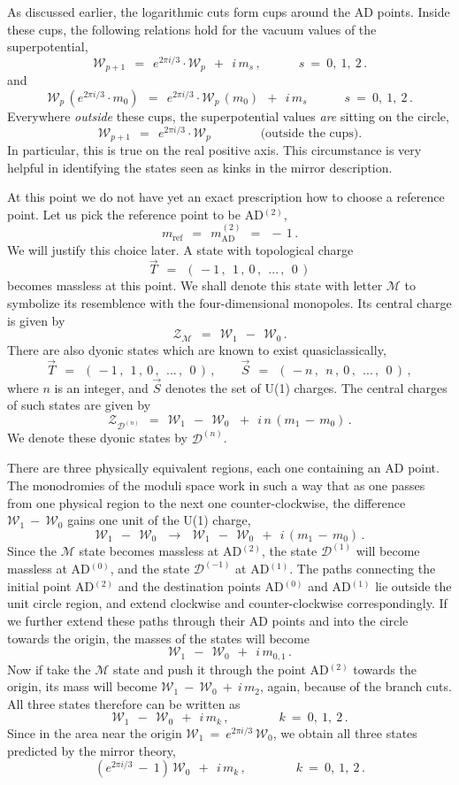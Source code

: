 \documentclass[epsfig,12pt]{article}
\def\beq{\begin{equation}}
\def\eeq{\end{equation}}
\def\beq{\begin{equation}}
\def\eeq{\end{equation}}
\newcommand{\mc}[1]{\mathcal{#1}}
\newcommand{\W}{\mathcal{W}}
\newcommand{\M}{\mathcal{M}}
\newcommand{\D}{\mathcal{D}}
\begin{document}
	As discussed earlier, the logarithmic cuts form cups around the AD points. 
	Inside these cups, the following relations hold for the vacuum values of the superpotential,
\beq
	\W_{p+1} ~~=~~ e^{2 \pi i / 3} \cdot \W_p ~~+~~ i\, m_s\,, \qquad\quad s~=~0,~1,~2\,.
\eeq
	and
\beq
	\W_p\, (e^{2 \pi i / 3} \cdot m_0) ~~=~~ e^{2 \pi i / 3} \cdot \W_p\, (m_0) ~~+~~ i\, m_s
	\qquad\quad s~=~0,~1,~2\,.
\eeq
	Everywhere {\it outside} these cups, the superpotential values {\it are} sitting on the circle,
\beq
	\W_{p+1} ~~=~~ e^{2 \pi i / 3} \cdot \W_p
	\qquad\qquad \text{(outside the cups)}.
\eeq
	In particular, this is true on the real positive axis.
	This circumstance is very helpful in identifying the states seen as kinks in the mirror description.

	At this point we do not have yet an exact prescription how to choose a reference point.
	Let us pick the reference point to be AD$^{(2)}$, 
\beq
	m_\text{ref} ~~=~~ m_\text{AD}^{(2)} ~~=~~ -\,1\,.
\eeq
	We will justify this choice later.
	A state with topological charge
\beq
	\vec{T} ~~=~~ (\, -1\,,~~ 1\,,~ 0 \,,~~ ...\,,~~ 0 \,)
\eeq
	becomes massless at this point.
	We shall denote this state with letter $ \mc{M} $ to symbolize its resemblence with 
	the four-dimensional monopoles. 
	Its central charge is given by
\beq
	\mc{Z_M} ~~=~~ \W_1 ~~-~~ \W_0\,.
\eeq
	There are also dyonic states which are known to exist quasiclassically,
\beq
	\vec{T} ~~=~~ (\, -1\,,~~ 1\,,~ 0 \,,~~ ...\,,~~ 0 \,)\,, \qquad
	\vec{S} ~~=~~ (\, -n\,,~~ n\,,~ 0 \,,~~ ...\,,~~ 0 \,)\,, 
\eeq
	where $ n $ is an integer, and $ \vec{S} $ denotes the set of U(1) charges.
	The central charges of such states are given by 
\beq
	\mc{Z}_{\mc{D}^{(n)}} ~~=~~ \W_1 ~~-~~ \W_0\, ~~+~~ i\, n\, ( m_1 \,-\, m_0 ) \,.
\eeq
	We denote these dyonic states by $ \mc{D}^{(n)} $.

	There are three physically equivalent regions, each one containing an AD point.
	The monodromies of the moduli space work in such a way that as one passes from 
	one physical region to the next one counter-clockwise, the difference 
$ \W_1 ~-~ \W_0 $
	gains one unit of the U(1) charge,
\beq
	\W_1 ~~-~~ \W_0  ~~~\to~~~ \W_1 ~~-~~ \W_0 ~~+~~ i\,( m_1 \,-\, m_0 ) \,.
\eeq
	Since the $ \M $ state becomes massless at AD$^{(2)}$, the state $ \D^{(1)} $ will become
	massless at AD$^{(0)}$, and the state $ \D^{(-1)} $ at AD$^{(1)}$.
	The paths connecting the initial point AD$^{(2)}$ and the destination points AD$^{(0)}$ and AD$^{(1)}$
	lie outside the unit circle region, and 
	extend clockwise and counter-clockwise correspondingly.
	If we further extend these paths through their AD points and into the circle towards the origin,
	the masses of the states will become
\beq
	\W_1 ~~-~~ \W_0 ~~+~~ i\, m_{0,1}\,.
\eeq
	Now if take the $ \M $ state and push it through the point AD$^{(2)}$ towards the origin,
	its mass will become $ \W_1 ~-~ \W_0 ~+~ i\,m_2 $, again, because of the branch cuts.
	All three states therefore can be written as
\beq
	\W_1 ~~-~~ \W_0 ~~+~~ i\, m_k\,,\qquad\qquad k~=~ 0,~1,~2\,.
\eeq
	Since in the area near the origin $ \W_1 ~=~ e^{2 \pi i / 3}\, \W_0 $, we obtain all three states 
	predicted by the mirror theory,
\beq
	(e^{2 \pi i /3} ~-~ 1)\, \W_0 ~~+~~ i\, m_k\,,\qquad\qquad k~=~ 0,~1,~2\,.
\eeq
\end{document}
